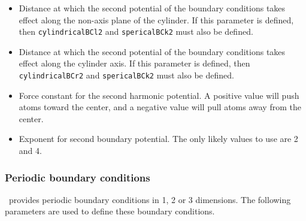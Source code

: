 \begin{itemize}
\item
{}
{Distance at which the second potential of the boundary conditions takes
effect along the non-axis plane of the cylinder.
If this parameter is defined, then {\tt cylindricalBCl2} and {\tt spericalBCk2} must also
be defined.}

\item
{}
{Distance at which the second potential of the boundary conditions takes
effect along the cylinder axis.
If this parameter is defined, then {\tt cylindricalBCr2} and {\tt spericalBCk2} must also
be defined.}

\item
{}
{Force constant for the second harmonic potential.  A positive
value will push atoms toward the center, and a negative
value will pull atoms away from the center.}

\item
{}
{Exponent for second boundary potential.  The only likely values to
use are 2 and 4.}

\end{itemize}


\subsubsection{Periodic boundary conditions}

\PDAC\ provides periodic boundary conditions in 1, 2 or 3 dimensions.
The following parameters are used to define these boundary conditions.  

